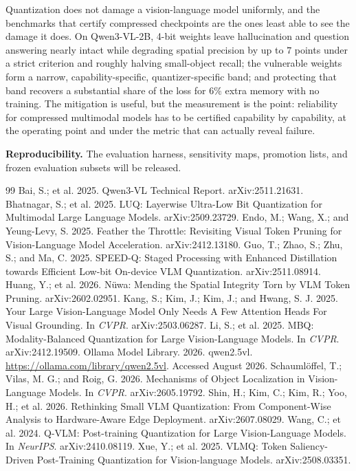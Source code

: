 \documentclass[letterpaper]{article} %
\begin{document}
Quantization does not damage a vision-language model uniformly, and the benchmarks that certify compressed checkpoints are the ones least able to see the damage it does. On Qwen3-VL-2B, 4-bit weights leave hallucination and question answering nearly intact while degrading spatial precision by up to $7$ points under a strict criterion and roughly halving small-object recall; the vulnerable weights form a narrow, capability-specific, quantizer-specific band; and protecting that band recovers a substantial share of the loss for $6\%$ extra memory with no training. The mitigation is useful, but the measurement is the point: reliability for compressed multimodal models has to be certified capability by capability, at the operating point and under the metric that can actually reveal failure.

\bigskip
\noindent\textbf{Reproducibility.} The evaluation harness, sensitivity maps, promotion lists, and frozen evaluation subsets will be released.


\begin{thebibliography}{99}
\small
{} Bai, S.; et al. 2025. Qwen3-VL Technical Report. arXiv:2511.21631.
 Bhatnagar, S.; et al. 2025. LUQ: Layerwise Ultra-Low Bit Quantization for Multimodal Large Language Models. arXiv:2509.23729.
 Endo, M.; Wang, X.; and Yeung-Levy, S. 2025. Feather the Throttle: Revisiting Visual Token Pruning for Vision-Language Model Acceleration. arXiv:2412.13180.
 Guo, T.; Zhao, S.; Zhu, S.; and Ma, C. 2025. SPEED-Q: Staged Processing with Enhanced Distillation towards Efficient Low-bit On-device VLM Quantization. arXiv:2511.08914.
 Huang, Y.; et al. 2026. N\"uwa: Mending the Spatial Integrity Torn by VLM Token Pruning. arXiv:2602.02951.
 Kang, S.; Kim, J.; Kim, J.; and Hwang, S. J. 2025. Your Large Vision-Language Model Only Needs A Few Attention Heads For Visual Grounding. In \emph{CVPR}. arXiv:2503.06287.
 Li, S.; et al. 2025. MBQ: Modality-Balanced Quantization for Large Vision-Language Models. In \emph{CVPR}. arXiv:2412.19509.
 Ollama Model Library. 2026. qwen2.5vl. \url{https://ollama.com/library/qwen2.5vl}. Accessed August 2026.
 Schauml\"offel, T.; Vilas, M. G.; and Roig, G. 2026. Mechanisms of Object Localization in Vision-Language Models. In \emph{CVPR}. arXiv:2605.19792.
 Shin, H.; Kim, C.; Kim, R.; Yoo, H.; et al. 2026. Rethinking Small VLM Quantization: From Component-Wise Analysis to Hardware-Aware Edge Deployment. arXiv:2607.08029.
 Wang, C.; et al. 2024. Q-VLM: Post-training Quantization for Large Vision-Language Models. In \emph{NeurIPS}. arXiv:2410.08119.
 Xue, Y.; et al. 2025. VLMQ: Token Saliency-Driven Post-Training Quantization for Vision-language Models. arXiv:2508.03351.
\end{thebibliography}
\end{document}
